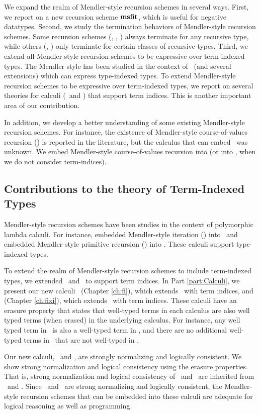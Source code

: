 We expand the realm of Mendler-style recursion schemes in several ways.
First, we report on a new recursion scheme $\mathbf{msfit}$, which is useful
for negative datatypes.  Second, we study the termination behaviors
of Mendler-style recursion schemes. Some recursion schemes (\eg, \MIt, \MsfIt)
always terminate for any recursive type, while others (\eg, \McvPr) only
terminate for certain classes of recursive types. Third, we extend
all Mendler-style recursion schemes to be expressive over term-indexed types.
The Mendler style has been studied in the context of \Fw\ (and several
extensions) which can express type-indexed types. To extend Mendler-style
recursion schemes to be expressive over term-indexed types, we report on
several theories for calculi (\Fi\ and \Fixi) that support term indices.
This is another important area of our contribution.

In addition, we develop a better understanding of some existing
Mendler-style recursion schemes. For instance, the existence of
Mendler-style course-of-values recursion (\McvPr) is reported
in the literature, but the calculus that can embed \McvPr\ was unknown.
We embed Mendler-style course-of-values recursion into \Fixi
(or into \Fixw, when we do not consider term-indices).

\subsection{Contributions to the theory of Term-Indexed Types}
Mendler-style recursion schemes have been studies in the context of
polymorphic lambda calculi. For instance, \citet{AbeMatUus03} embedded 
Mendler-style iteration (\MIt) into \Fw\ and \citet{AbeMat04} embedded
Mendler-style primitive recursion (\MPr) into \Fixw. These calculi
support type-indexed types.

To extend the realm of Mendler-style recursion schemes to include
term-indexed types, we extended \Fw\ and \Fixw\ to support term indices.
In Part \ref{part:Calculi}, we present our new calculi
\Fi\ (Chapter \ref{ch:fi}), which extends \Fw\ with term indices, and
\Fixi (Chapter \ref{ch:fixi}), which extends \Fixw\ with term indices.
These calculi have an erasure property that states that well-typed terms
in each calculus are also well typed terms (when erased) in the 
underlying calculus. For instance, any well typed term in \Fi\ is also
a well-typed term in \Fw, and there are no additional well-typed terms
in \Fi\ that are not well-typed in \Fw.

Our new calculi, \Fi\ and \Fixi, are strongly normalizing and
logically consistent. We show strong normalization and logical consistency
using the erasure properties. That is, strong normalization and
logical consistency of \Fi\ and \Fixi\ are inherited from \Fw\ and \Fixw.
Since \Fi\ and \Fixi\ are strong normalizing and logically  consistent,
the Mendler-style recursion schemes that can be embedded into these calculi
are adequate for logical reasoning as well as programming.

